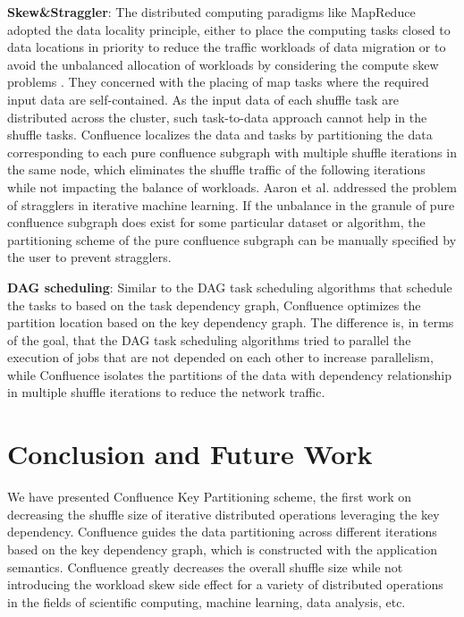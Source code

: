 \documentclass[10pt,journal,compsoc]{IEEEtran}
\begin{document}
\textbf{Skew\&Straggler}: 
The distributed computing paradigms like MapReduce adopted the data locality principle, either to place the computing tasks closed to data locations in priority to reduce the traffic workloads of data migration \cite{dean2008mapreduce, zaharia2008improving} or to avoid the unbalanced allocation of workloads by considering the compute skew problems \cite{kwon2010skew, kwon2012skewtune}. 
They concerned with the placing of map tasks where the required input data are self-contained.
As the input data of each shuffle task are distributed across the cluster, such task-to-data approach cannot help in the shuffle tasks. 
Confluence localizes the data and tasks by partitioning the data corresponding to each pure confluence subgraph with multiple shuffle iterations in the same node, which eliminates the shuffle traffic of the following iterations while not impacting the balance of workloads.
Aaron et al. \cite{Harlap:2016:ASP} addressed the problem of stragglers in iterative machine learning. If the unbalance in the granule of pure confluence subgraph does exist for some particular dataset or algorithm, the partitioning scheme of the pure confluence subgraph can be manually specified by the user to prevent stragglers. 

\textbf{DAG scheduling}: 
Similar to the DAG task scheduling algorithms \cite{sakellariou2004hybrid, zhao2006scheduling, spark-dagscheduler, isard2007dryad} that schedule the tasks to based on the task dependency graph, Confluence optimizes the partition location based on the key dependency graph. 
The difference is, in terms of the goal, that the DAG task scheduling algorithms tried to parallel the execution of jobs that are not depended on each other to increase parallelism, while Confluence isolates the partitions of the data with dependency relationship in multiple shuffle iterations to reduce the network traffic. 


\section{Conclusion and Future Work}\label{section:conclusion}
We have presented Confluence Key Partitioning scheme, the first work on decreasing the shuffle size of
iterative distributed operations leveraging the key dependency. 
Confluence guides the data partitioning across different iterations based on the key dependency graph, 
which is constructed with the application semantics.
Confluence greatly decreases the overall shuffle size while not introducing the workload skew side effect for a variety of distributed operations
in the fields of scientific computing, machine learning, data
analysis, etc.
\end{document}
